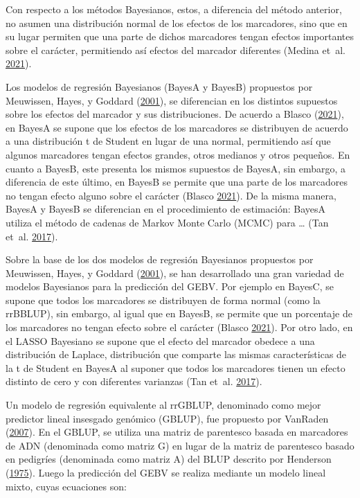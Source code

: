 \documentclass[11pt,spanish,a4paper,oneside,]{book} %
\begin{document}
Con respecto a los métodos Bayesianos, estos, a diferencia del método anterior, no asumen una distribución normal de los efectos de los marcadores, sino que en su lugar permiten que una parte de dichos marcadores tengan efectos importantes sobre el carácter, permitiendo así efectos del marcador diferentes (Medina et~al. \protect\hyperlink{ref-cite:38}{2021}).

Los modelos de regresión Bayesianos (BayesA y BayesB) propuestos por Meuwissen, Hayes, y Goddard (\protect\hyperlink{ref-cite:8}{2001}), se diferencian en los distintos supuestos sobre los efectos del marcador y sus distribuciones. De acuerdo a Blasco (\protect\hyperlink{ref-cite:21}{2021}), en BayesA se supone que los efectos de los marcadores se distribuyen de acuerdo a una distribución t de Student en lugar de una normal, permitiendo así que algunos marcadores tengan efectos grandes, otros medianos y otros pequeños. En cuanto a BayesB, este presenta los mismos supuestos de BayesA, sin embargo, a diferencia de este último, en BayesB se permite que una parte de los marcadores no tengan efecto alguno sobre el carácter (Blasco \protect\hyperlink{ref-cite:21}{2021}). De la misma manera, BayesA y BayesB se diferencian en el procedimiento de estimación: BayesA utiliza el método de cadenas de Markov Monte Carlo (MCMC) para \ldots{} (Tan et~al. \protect\hyperlink{ref-cite:34}{2017}).

Sobre la base de los dos modelos de regresión Bayesianos propuestos por Meuwissen, Hayes, y Goddard (\protect\hyperlink{ref-cite:8}{2001}), se han desarrollado una gran variedad de modelos Bayesianos para la predicción del GEBV. Por ejemplo en BayesC, se supone que todos los marcadores se distribuyen de forma normal (como la rrBBLUP), sin embargo, al igual que en BayesB, se permite que un porcentaje de los marcadores no tengan efecto sobre el carácter (Blasco \protect\hyperlink{ref-cite:21}{2021}). Por otro lado, en el LASSO Bayesiano se supone que el efecto del marcador obedece a una distribución de Laplace, distribución que comparte las mismas características de la t de Student en BayesA al suponer que todos los marcadores tienen un efecto distinto de cero y con diferentes varianzas (Tan et~al. \protect\hyperlink{ref-cite:34}{2017}).

Un modelo de regresión equivalente al rrGBLUP, denominado como mejor predictor lineal insesgado genómico (GBLUP), fue propuesto por VanRaden (\protect\hyperlink{ref-cite:39}{2007}). En el GBLUP, se utiliza una matriz de parentesco basada en marcadores de ADN (denominada como matriz G) en lugar de la matriz de parentesco basado en pedigríes (denominada como matriz A) del BLUP descrito por Henderson (\protect\hyperlink{ref-cite:41}{1975}). Luego la predicción del GEBV se realiza mediante un modelo lineal mixto, cuyas ecuaciones son:
\end{document}
